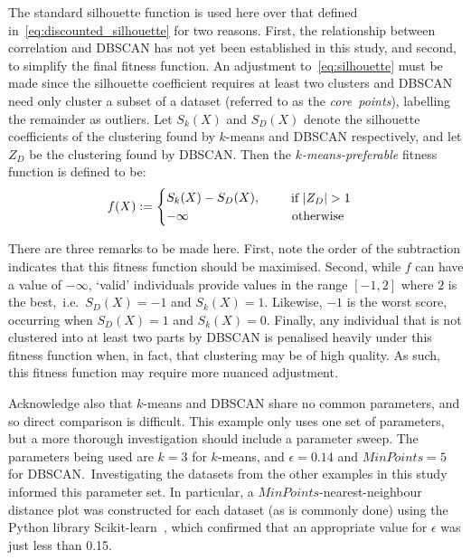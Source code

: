 The standard silhouette function is used here over that defined
in~\eqref{eq:discounted_silhouette} for two reasons. First, the relationship
between correlation and DBSCAN has not yet been established in this study, and
second, to simplify the final fitness function. An adjustment
to~\eqref{eq:silhouette} must be made since the silhouette coefficient requires
at least two clusters and DBSCAN need only cluster a subset of a dataset
(referred to as the \emph{core~points}), labelling the remainder as outliers.
Let \(S_k (X)\) and \(S_D (X)\) denote the silhouette coefficients of the
clustering found by \(k\)-means and DBSCAN respectively, and let \(Z_D\) be the
clustering found by DBSCAN. Then the \emph{\(k\)-means-preferable} fitness
function is defined to be:
\begin{equation}\label{eq:kmeans_preferable}
    f(X) :=
        \begin{cases}
            S_k (X) - S_D (X), &\quad \text{%
                \begin{tabular}{l}%
                    if \(\left|Z_D\right| > 1\)
                \end{tabular}
            }\\
            - \infty &\quad \ \ \text{otherwise}
        \end{cases}
\end{equation}

There are three remarks to be made here. First, note the order of the
subtraction indicates that this fitness function should be maximised. Second,
while \(f\) can have a value of \(-\infty\), `valid' individuals provide values
in the range \([-1, 2]\) where \(2\) is the best,~i.e.\ \(S_D(X) = -1\) and
\(S_k(X) = 1\). Likewise, \(-1\) is the worst score, occurring when \(S_D(X)=1\)
and \(S_k(X) = 0\). Finally, any individual that is not clustered into at least
two parts by DBSCAN is penalised heavily under this fitness function when, in
fact, that clustering may be of high quality. As such, this fitness function may
require more nuanced adjustment.

Acknowledge also that \(k\)-means and DBSCAN share no common parameters, and so
direct comparison is difficult. This example only uses one set of parameters,
but a more thorough investigation should include a parameter sweep. The
parameters being used are \(k=3\) for \(k\)-means, and \(\epsilon=0.14\) and
\(MinPoints=5\) for DBSCAN.\ Investigating the datasets from the other examples
in this study informed this parameter set. In particular, a
\(MinPoints\)-nearest-neighbour distance plot was constructed for each dataset
(as is commonly done) using the Python library Scikit-learn~\cite{scikit}, which
confirmed that an appropriate value for \(\epsilon\) was just less than 0.15.

